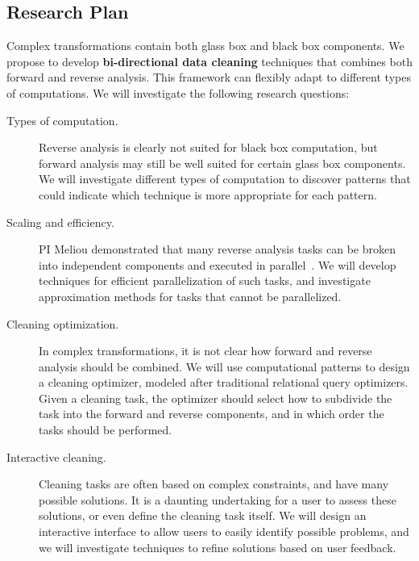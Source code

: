 \subsection{Research Plan} %
\label{sub:research_plan}
Complex transformations contain both glass box and black box components. We propose to develop \textbf{bi-directional data cleaning} techniques that combines both forward and reverse analysis. This framework can flexibly adapt to different types of computations. We will investigate the following research questions:
\begin{description}
	\item[Types of computation.] Reverse analysis is clearly not suited for black box computation, but forward analysis may still be well suited for certain glass box components. We will investigate different types of computation to discover patterns that could indicate which technique is more appropriate for each pattern.
	\item[Scaling and efficiency.] PI Meliou demonstrated that many reverse analysis tasks can be broken into independent components and executed in parallel~\cite{DBLP:conf/sigmod/MeliouS12}. We will develop techniques for efficient parallelization of such tasks, and investigate approximation methods for tasks that cannot be parallelized.
	\item[Cleaning optimization.] In complex transformations, it is not clear how forward and reverse analysis should be combined. We will use computational patterns to design a cleaning optimizer, modeled after traditional relational query optimizers. Given a cleaning task, the optimizer should select how to subdivide the task into the forward and reverse components, and in which order the tasks should be performed.
	\item[Interactive cleaning.] Cleaning tasks are often based on complex constraints, and have many possible solutions. It is a daunting undertaking for a user to assess these solutions, or even define the cleaning task itself.  We will design an interactive interface to allow users to easily identify possible problems, and we will investigate techniques to refine solutions based on user feedback.
\end{description}





